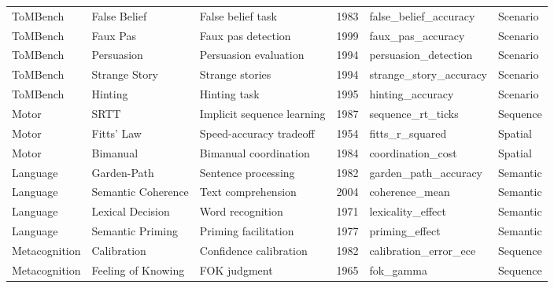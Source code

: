 \documentclass[10pt,landscape]{article}
\begin{document}
\begin{longtable}{@{}p{2.3cm}p{3.0cm}p{4.5cm}p{0.6cm}p{3.8cm}p{1.8cm}@{}}
\midrule
ToMBench & False Belief & False belief task \citep{baroncohen1985mindblindness} & 1983 & false\_belief\_accuracy & Scenario \\
ToMBench & Faux Pas & Faux pas detection \citep{stone1998faux} & 1999 & faux\_pas\_accuracy & Scenario \\
ToMBench & Persuasion & Persuasion evaluation & 1994 & persuasion\_detection & Scenario \\
ToMBench & Strange Story & Strange stories \citep{happe1994advanced} & 1994 & strange\_story\_accuracy & Scenario \\
ToMBench & Hinting & Hinting task \citep{corcoran1995schizophrenia} & 1995 & hinting\_accuracy & Scenario \\

\midrule
Motor & SRTT & Implicit sequence learning \citep{nissen1987attentional} & 1987 & sequence\_rt\_ticks & Sequence \\
Motor & Fitts' Law & Speed-accuracy tradeoff \citep{fitts1954information} & 1954 & fitts\_r\_squared & Spatial \\
Motor & Bimanual & Bimanual coordination & 1984 & coordination\_cost & Spatial \\

\midrule
Language & Garden-Path & Sentence processing \citep{ferreira2002good} & 1982 & garden\_path\_accuracy & Semantic \\
Language & Semantic Coherence & Text comprehension & 2004 & coherence\_mean & Semantic \\
Language & Lexical Decision & Word recognition & 1971 & lexicality\_effect & Semantic \\
Language & Semantic Priming & Priming facilitation & 1977 & priming\_effect & Semantic \\

\midrule
Metacognition & Calibration & Confidence calibration & 1982 & calibration\_error\_ece & Sequence \\
Metacognition & Feeling of Knowing & FOK judgment & 1965 & fok\_gamma & Sequence \\


\end{longtable}
\end{document}
